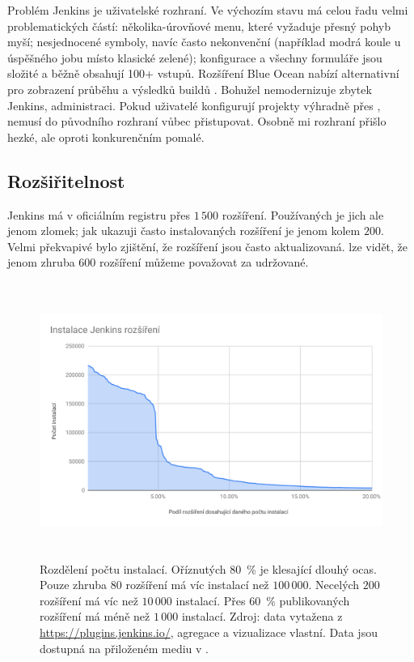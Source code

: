         Problém Jenkins je uživatelské rozhraní. Ve výchozím stavu má  celou řadu velmi problematických částí: několika-úrovňové menu, které vyžaduje přesný pohyb myší; nesjednocené symboly, navíc často nekonvenční (například modrá koule u úspěšného jobu místo klasické zelené); konfigurace a všechny formuláře jsou složité a běžně obsahují 100+ vstupů. Rozšíření Blue Ocean nabízí alternativní  pro zobrazení průběhu a výsledků buildů \cite{jenkins-plugin-blueocean}. Bohužel nemodernizuje zbytek Jenkins, administraci. Pokud uživatelé konfigurují projekty výhradně přes , nemusí do původního rozhraní vůbec přistupovat. Osobně mi rozhraní přišlo hezké, ale oproti konkurenčním \CICD pomalé.

    \subsection{Rozšiřitelnost}
        Jenkins má v oficiálním registru přes $1\,500$ rozšíření. Používaných je jich ale jenom zlomek; jak ukazuji  často instalovaných rozšíření je jenom kolem $200$. Velmi překvapivé bylo zjištění, že rozšíření jsou často aktualizovaná.  lze vidět, že jenom zhruba $600$ rozšíření můžeme považovat za udržované.

        \begin{figure}[htb!]
            \centering
            \includegraphics[width=\textwidth,height=9cm,keepaspectratio]{media/jenkins-plugins.pdf}
            \caption{Rozdělení počtu instalací. Oříznutých 80~\% je klesající dlouhý ocas. Pouze zhruba $80$ rozšíření má víc instalací než $100\,000$. Necelých $200$ rozšíření má víc než $10\,000$ instalací. Přes 60~\% publikovaných rozšíření má méně než $1\,000$ instalací. Zdroj: data vytažena z \url{https://plugins.jenkins.io/}, agregace a vizualizace vlastní. Data jsou dostupná na přiloženém mediu v .}
            \label{fig:jenkins-plugins}
        \end{figure}

